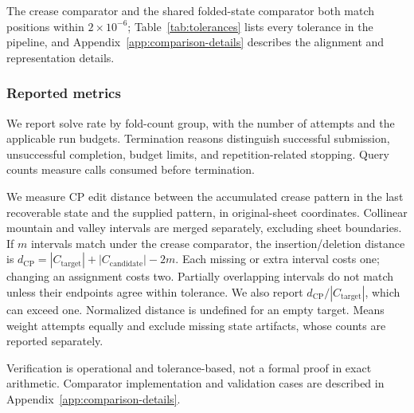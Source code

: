 The crease comparator and the shared folded-state
comparator both match positions within $2\times10^{-6}$; Table~\ref{tab:tolerances} lists every
tolerance in the pipeline, and Appendix~\ref{app:comparison-details} describes the alignment and
representation details.

\subsubsection{Reported metrics}
\label{sec:scoring-metrics}

We report solve rate by fold-count group, with the number of attempts and the applicable run
budgets. Termination reasons distinguish successful submission, unsuccessful completion, budget
limits, and repetition-related stopping. Query counts measure calls consumed before termination.

We measure CP edit distance between the accumulated crease pattern in the last recoverable
state and the supplied pattern, in original-sheet coordinates. Collinear mountain and valley
intervals are merged separately, excluding sheet boundaries. If $m$ intervals match under the
crease comparator, the insertion/deletion distance is
$d_{\mathrm{CP}}=|C_{\mathrm{target}}|+|C_{\mathrm{candidate}}|-2m$.
Each missing or extra interval costs one; changing an assignment costs two. Partially overlapping
intervals do not match unless their endpoints agree within tolerance. We also report
$d_{\mathrm{CP}}/|C_{\mathrm{target}}|$, which can exceed one. Normalized distance is undefined
for an empty target. Means weight attempts equally and exclude missing state artifacts,
whose counts are reported separately.

\label{sec:scoring-validate}
Verification is operational and tolerance-based, not a formal proof in exact arithmetic.
Comparator implementation and validation cases are described in
Appendix~\ref{app:comparison-details}.
